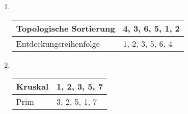 \documentclass[11pt,a4paper]{article}
\begin{document}
\begin{loesung}
    \begin{enumerate}
        \item  \ \\
        \begin{table}[h!]
            \centering
            \begin{tabular}{|l|l|}
                \hline
                Topologische Sortierung & 4, 3, 6, 5, 1, 2 \\
                \hline
                Entdeckungsreihenfolge & 1, 2, 3, 5, 6, 4 \\
                \hline
            \end{tabular}
        \end{table}
        \FloatBarrier
        \item \ \\
        \begin{table}[h!]
            \centering
            \begin{tabular}{|l|l|}
                \hline
                Kruskal & 1, 2, 3, 5, 7 \\
                \hline
                Prim & 3, 2, 5, 1, 7\\
                \hline
            \end{tabular}
        \end{table}
    \end{enumerate}
\end{loesung}
\end{document}
